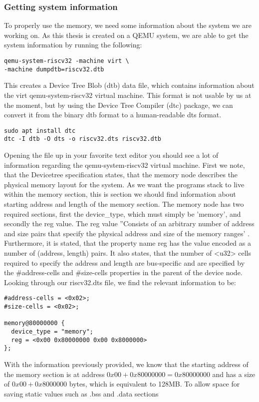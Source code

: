 \subsubsection{Getting system information}\label{sec:sys-info}
To properly use the memory, we need some information about the system we are
working on. As this thesis is created on a QEMU system, we are able to get the
system information by running the following:
\begin{lstlisting}
qemu-system-riscv32 -machine virt \
-machine dumpdtb=riscv32.dtb
\end{lstlisting}
 This creates a Device Tree Blob (dtb) data file, which contains information
 about the virt qemu-system-riscv32 virtual machine. This format is not usable
 by us at the moment, but by using the Device Tree Compiler (dtc) package, we
 can convert it from the binary dtb format to a human-readable dts format.
\begin{lstlisting}
sudo apt install dtc
dtc -I dtb -O dts -o riscv32.dts riscv32.dtb
\end{lstlisting}
Opening the file up in your favorite text editor you should see a lot of
information regarding the qemu-system-riscv32 virtual machine. First we note,
that the Devicetree specification states, that the memory node describes the
physical memory layout for the system. As we want the programs stack to live
within the memory section, this is section we should find information about
starting address and length of the memory section. The memory node has two
required sections, first the device\_type, which must simply be 'memory', and
secondly the reg value. The reg value ''Consists of an arbitrary number of
address and size pairs that specify the physical address and size of the memory
ranges' \cite{DTS}. Furthermore, it is stated, that the property name reg has
the value encoded as a number of (address, length) pairs. It also states, that
the number of <u32> cells required to specify the address and length are
bus-specific and are specified by the \#address-cells and \#size-cells
properties in the parent of the device node. Looking through our riscv32.dts
file, we find the relevant information to be:
\begin{lstlisting}
#address-cells = <0x02>;
#size-cells = <0x02>;

memory@80000000 {
  device_type = "memory";
  reg = <0x00 0x80000000 0x00 0x8000000>
};
\end{lstlisting}
With the information previously provided, we know that the starting address of
the memory section is at address $0x00 + 0x80000000 = 0x80000000$ and has a size
of $0x00 + 0x8000000$ bytes, which is equivalent to 128MB. To allow space for
saving static values such as .bss and .data sections

